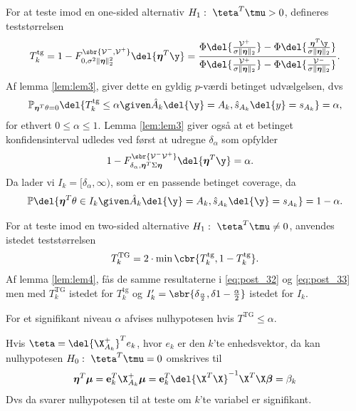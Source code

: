 For at teste imod en one-sided alternativ \(H_1: \ \teta^T \tmu > 0\),  defineres teststørrelsen
\begin{align*}
T_k^\text{tg}=1- F_{0, \sigma^2 \Vert \boldsymbol{\eta} \Vert_2^2}^{\sbr{\mathcal{V}^-, \mathcal{V}^+}} \del{\boldsymbol{\eta}^T \y} = \frac{\Phi \del{\frac{\mathcal{V}^+}{\sigma \Vert \boldsymbol{\eta} \Vert_2}}-\Phi \del{\frac{\boldsymbol{\eta}^T \y}{\sigma  \Vert \boldsymbol{\eta} \Vert_2}}}{\Phi \del{\frac{\mathcal{V}^+}{\sigma  \Vert \boldsymbol{\eta} \Vert_2}}-\Phi \del{\frac{\mathcal{V}^-}{\sigma \Vert \boldsymbol{\eta} \Vert_2}}}.
\end{align*}
Af lemma \ref{lem:lem3}, giver dette en gyldig \(p\)-værdi betinget udvælgelsen, dvs
\begin{align}
\mathbb{P}_{\boldsymbol{\eta}^T \theta = 0} \del{T_k^\text{tg} \leq \alpha \given \hat{A}_k \del{\y} = A_k, \hat{s}_{A_k} \del{y} = s_{A_k}} = \alpha, \label{eq:post_32}
\end{align}
for ethvert \(0 \leq \alpha \leq 1\).
Lemma \ref{lem:lem3} giver også at et betinget konfidensinterval udledes ved først at udregne \(\delta_\alpha\) som opfylder
\begin{align*}
1-F_{\delta_{\alpha}, \boldsymbol{\eta}^T \Sigma \boldsymbol{\eta}}^{\sbr{\mathcal{V}^- \mathcal{V}^+}} \del{\boldsymbol{\eta}^T \y} &= \alpha.
\end{align*}
Da lader vi \(I_k = [\delta_\alpha, \infty)\), som er en passende betinget coverage, da
\begin{align}
\mathbb{P} \del{\boldsymbol{\eta}^T \theta \in I_k \given \hat{A}_k \del{\y} = A_k, \hat{s}_{A_k} \del{\y} = s_{A_k}} = 1-\alpha. \label{eq:post_33}
\end{align}

For at teste imod en two-sided alternative \(H_1: \ \teta^T \tmu \neq 0\), anvendes istedet teststørrelsen
\begin{align*}
T_k^\text{TG}= 2 \cdot \min \cbr{T_k^{\text{tg}}, 1-T_k^{\text{tg}}}.
\end{align*}
Af lemma \ref{lem:lem4}, fås de samme resultaterne i \eqref{eq:post_32} og \eqref{eq:post_33} men med \(T_k^\text{TG}\) istedet for \(T_k^\text{tg}\) og \(I_k'= \sbr{\delta_{\frac{\alpha}{2}}, \delta{1-\frac{\alpha}{2}}}\) istedet for \(I_k\).

For et signifikant niveau $\alpha$ afvises nulhypotesen hvis \(T^{\text{TG}} \leq \alpha\).



Hvis \(\teta = \del{\X_{A_k}^+}^T e_k\), hvor \(e_k\) er den \(k\)'te enhedsvektor, da kan nulhypotesen \(H_0: \ \teta^T \tmu =0\) omskrives til
\begin{align*}
\boldsymbol{\eta}^T \boldsymbol{\mu} = \mathbf{e}_k^T \X_{A_k}^+ \boldsymbol{\mu} = \mathbf{e}_k^T \del{\X^T \X}^{-1} \X^T \X \boldsymbol{\beta} = \beta_k
\end{align*}
Dvs da svarer nulhypotesen til at teste om \(k\)'te variabel er signifikant.


